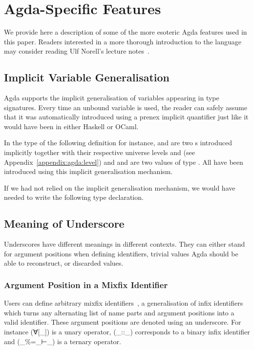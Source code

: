 \section{Agda-Specific Features}\label{appendix:agda}

We provide here a description of some of the more esoteric Agda features
used in this paper. Readers interested in a more thorough introduction to
the language may consider reading Ulf Norell's lecture
notes~\cite{DBLP:conf/afp/Norell08}.

\subsection{Implicit Variable Generalisation}\label{appendix:agda:variable}

Agda supports the implicit generalisation of variables appearing in type signatures.
Every time an unbound variable is used, the reader can safely assume that
it was automatically introduced using a prenex implicit quantifier just like
it would have been in either Haskell or OCaml.

In the type of the following definition for instance,  and  are
two s introduced implicitly together with their respective universe
levels  and  (see Appendix~\ref{appendix:agda:level}) and 
and  are two values of type . All have been introduced using this
implicit generalisation mechanism.


If we had not relied on the implicit generalisation mechanism, we would have
needed to write the following type declaration.


\subsection{Meaning of Underscore}

Underscores have different meanings in different contexts. They can either stand
for argument positions when defining identifiers, trivial values Agda should be
able to reconstruct, or discarded values.

\subsubsection{Argument Position in a Mixfix Identifier}

Users can define arbitrary mixfix identifiers~\cite{DBLP:conf/ifl/DanielssonN08},
a generalisation of infix identifiers which turns any alternating list of name
parts and argument positions into a valid identifier. These argument positions
are denoted using an underscore. For instance ({∀[\_]}) is a unary operator,
({\_::\_}) corresponds to a binary infix identifier and ({\_\%=\_⊢\_}) is a
ternary operator.

